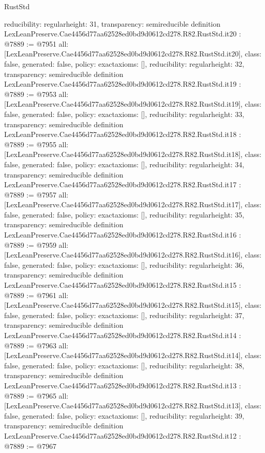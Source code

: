 \begin{lexlean}{RustStd}
\begin{coremodule}
{  reducibility: regular{height: 31},
  transparency: semireducible
}
definition LexLeanPreserve.Cae4456d77aa62528ed0bd9d0612cd278.R82.RustStd.it20 : @7889 := @7951 {
  all: [LexLeanPreserve.Cae4456d77aa62528ed0bd9d0612cd278.R82.RustStd.it20],
  class: false,
  generated: false,
  policy: exact{axioms: []},
  reducibility: regular{height: 32},
  transparency: semireducible
}
definition LexLeanPreserve.Cae4456d77aa62528ed0bd9d0612cd278.R82.RustStd.it19 : @7889 := @7953 {
  all: [LexLeanPreserve.Cae4456d77aa62528ed0bd9d0612cd278.R82.RustStd.it19],
  class: false,
  generated: false,
  policy: exact{axioms: []},
  reducibility: regular{height: 33},
  transparency: semireducible
}
definition LexLeanPreserve.Cae4456d77aa62528ed0bd9d0612cd278.R82.RustStd.it18 : @7889 := @7955 {
  all: [LexLeanPreserve.Cae4456d77aa62528ed0bd9d0612cd278.R82.RustStd.it18],
  class: false,
  generated: false,
  policy: exact{axioms: []},
  reducibility: regular{height: 34},
  transparency: semireducible
}
definition LexLeanPreserve.Cae4456d77aa62528ed0bd9d0612cd278.R82.RustStd.it17 : @7889 := @7957 {
  all: [LexLeanPreserve.Cae4456d77aa62528ed0bd9d0612cd278.R82.RustStd.it17],
  class: false,
  generated: false,
  policy: exact{axioms: []},
  reducibility: regular{height: 35},
  transparency: semireducible
}
definition LexLeanPreserve.Cae4456d77aa62528ed0bd9d0612cd278.R82.RustStd.it16 : @7889 := @7959 {
  all: [LexLeanPreserve.Cae4456d77aa62528ed0bd9d0612cd278.R82.RustStd.it16],
  class: false,
  generated: false,
  policy: exact{axioms: []},
  reducibility: regular{height: 36},
  transparency: semireducible
}
definition LexLeanPreserve.Cae4456d77aa62528ed0bd9d0612cd278.R82.RustStd.it15 : @7889 := @7961 {
  all: [LexLeanPreserve.Cae4456d77aa62528ed0bd9d0612cd278.R82.RustStd.it15],
  class: false,
  generated: false,
  policy: exact{axioms: []},
  reducibility: regular{height: 37},
  transparency: semireducible
}
definition LexLeanPreserve.Cae4456d77aa62528ed0bd9d0612cd278.R82.RustStd.it14 : @7889 := @7963 {
  all: [LexLeanPreserve.Cae4456d77aa62528ed0bd9d0612cd278.R82.RustStd.it14],
  class: false,
  generated: false,
  policy: exact{axioms: []},
  reducibility: regular{height: 38},
  transparency: semireducible
}
definition LexLeanPreserve.Cae4456d77aa62528ed0bd9d0612cd278.R82.RustStd.it13 : @7889 := @7965 {
  all: [LexLeanPreserve.Cae4456d77aa62528ed0bd9d0612cd278.R82.RustStd.it13],
  class: false,
  generated: false,
  policy: exact{axioms: []},
  reducibility: regular{height: 39},
  transparency: semireducible
}
definition LexLeanPreserve.Cae4456d77aa62528ed0bd9d0612cd278.R82.RustStd.it12 : @7889 := @7967 {
}
\end{coremodule}
\end{lexlean}
